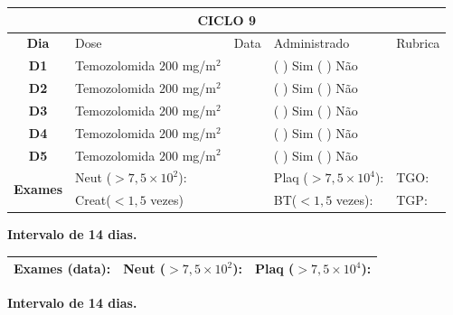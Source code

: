 \documentclass[11pt,a4paper,oldfontcommands]{memoir}
\begin{document}
\begin{center}
\begin{longtable}{p{1cm}p{4cm}|p{1cm}|p{4.6cm}|p{3cm}}
	\hline
	\multicolumn{5}{c}{\textbf{CICLO 9}}\\
\hline
    \multicolumn{1}{c|}{\multirow{1}{*}{\textbf{Dia}}}&{Dose}&{Data}&{Administrado}&{Rubrica} \\
    \hline
    \multicolumn{1}{c|}{\multirow{1}{*}{\textbf{D1}}}&{Temozolomida \(200\) mg/m\(^2\)}&&{(  ) Sim (  ) Não}&\\
    \multicolumn{1}{c|}{\multirow{1}{*}{\textbf{D2}}}&{Temozolomida \(200\) mg/m\(^2\)}&&{(  ) Sim (  ) Não}&\\
    \multicolumn{1}{c|}{\multirow{1}{*}{\textbf{D3}}}&{Temozolomida \(200\) mg/m\(^2\)}&&{(  ) Sim (  ) Não}&\\
    \multicolumn{1}{c|}{\multirow{1}{*}{\textbf{D4}}}&{Temozolomida \(200\) mg/m\(^2\)}&&{(  ) Sim (  ) Não}&\\
    \multicolumn{1}{c|}{\multirow{1}{*}{\textbf{D5}}}&{Temozolomida \(200\) mg/m\(^2\)}&&{(  ) Sim (  ) Não}&\\
    \hline
    \multicolumn{1}{c|}{\multirow{2}{*}{\textbf{Exames}}}&\multicolumn{2}{l|}{Neut (\(>7,5\times10^2\)):}&{Plaq (\(>7,5\times10^4\)):}&{TGO:}\\
    \cline{2-5}
    \multicolumn{1}{c|}{\multirow{2}{*}{{}}}&\multicolumn{2}{l|}{Creat(\(<1,5\) vezes)}&{BT(\(<1,5\) vezes):}&{TGP:}
    \\
    \hline
\end{longtable}
\textbf{Intervalo de 14 dias.}
\begin{longtable}{p{5cm}|p{5cm}|p{4.5cm}}
    \hline
    \textbf{Exames (data):}&{Neut (\(>7,5\times10^2\)):}&{Plaq (\(>7,5\times10^4\)):}
    \\
    \hline
\end{longtable}
\textbf{Intervalo de 14 dias.}
\end{center}
\end{document}
